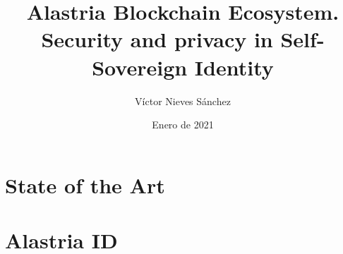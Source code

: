 \documentclass[a4paper, 12pt]{article} %
\author{Víctor Nieves Sánchez}
\date{Enero de 2021}
\title{Alastria Blockchain Ecosystem. Security and privacy in Self-Sovereign Identity}
\begin{document}
\maketitle
\null
\newpage


\begin{otherlanguage}{spanish}
    \renewcommand{\spanishabstractname}{Agradecimientos}
    \begin{abstract}
        
    \end{abstract}
\end{otherlanguage}

\newpage
\tableofcontents

\newpage
\listoffigures

\newpage
\listoftables

\newpage
\lstlistoflistings

\newpage
\printglossary[type=\acronymtype]

\newpage
\begin{otherlanguage}{spanish}
    \renewcommand{\spanishabstractname}{Resumen}
    \begin{abstract}
        \normalsize
        
    \end{abstract}
\end{otherlanguage}

\newpage
\begin{abstract}
    \normalsize
    
\end{abstract}

\newpage
{} %
\UseRawInputEncoding %
 

\newpage
\section{State of the Art}
    
    
    
    
             
    
\newpage
\section{Alastria ID}
    
    
    
           
    
        
\end{document}
